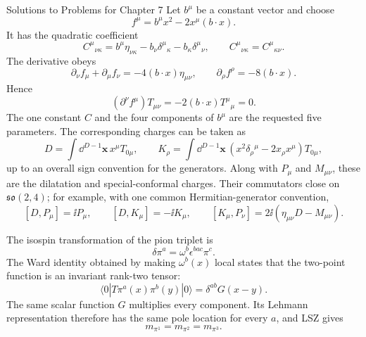 \begin{bankssolutions}{Solutions to Problems for Chapter 7}
Let $b^\mu$ be a constant vector and choose
\[
 f^\mu=b^\mu x^2-2x^\mu(b\cdot x).
\]
It has the quadratic coefficient
\[
 C^\mu{}_{\nu\kappa}
 =b^\mu\eta_{\nu\kappa}
 -b_\nu\delta^\mu{}_\kappa
 -b_\kappa\delta^\mu{}_\nu,
 \qquad C^\mu{}_{\nu\kappa}=C^\mu{}_{\kappa\nu}.
\]
The derivative obeys
\[
 \partial_\nu f_\mu+\partial_\mu f_\nu
 =-4(b\cdot x)\eta_{\mu\nu},
 \qquad
 \partial_\rho f^\rho=-8(b\cdot x).
\]
Hence
\[
 (\partial^\nu f^\mu)T_{\mu\nu}
 =-2(b\cdot x)T^\mu{}_\mu=0.
\]
The one constant $C$ and the four components of $b^\mu$ are the requested
five parameters.  The corresponding charges can be taken as
\[
 D=\int\dd^{D-1}\mathbf x\,x^\mu T_{0\mu},
 \qquad
 K_\rho=\int\dd^{D-1}\mathbf x\,
 \left(x^2\delta_\rho{}^\mu-2x_\rho x^\mu\right)T_{0\mu},
\]
up to an overall sign convention for the generators.  Along with
$P_\mu$ and $M_{\mu\nu}$, these are the dilatation and special-conformal
charges.  Their commutators close on $\mathfrak{so}(2,4)$; for example,
with one common Hermitian-generator convention,
\[
 [D,P_\mu]=\ii P_\mu,\qquad [D,K_\mu]=-\ii K_\mu,\qquad
 [K_\mu,P_\nu]=2\ii(\eta_{\mu\nu}D-M_{\mu\nu}).
\]

The isospin transformation of the pion triplet is
\[
 \delta\pi^a=\omega^b\epsilon^{bac}\pi^c.
\]
The Ward identity obtained by making $\omega^b(x)$ local states that the
two-point function is an invariant rank-two tensor:
\[
 \langle0|T\pi^a(x)\pi^b(y)|0\rangle
 =\delta^{ab}G(x-y).
\]
The same scalar function $G$ multiplies every component.  Its
Lehmann representation therefore has the same pole location for every
$a$, and LSZ gives
\[
 m_{\pi^1}=m_{\pi^2}=m_{\pi^3}.
\]


\end{bankssolutions}
